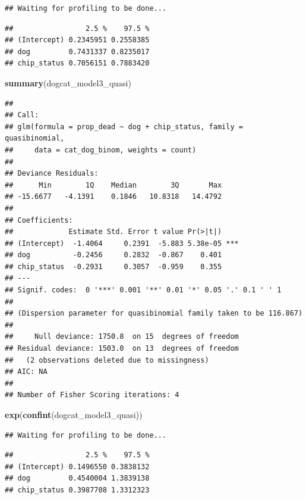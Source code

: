 \documentclass[]{article}
\newenvironment{Shaded}{\begin{snugshade}}{\end{snugshade}}
\newcommand{\KeywordTok}[1]{\textcolor[rgb]{0.13,0.29,0.53}{\textbf{#1}}}
\newcommand{\NormalTok}[1]{#1}
\begin{document}
\begin{verbatim}
## Waiting for profiling to be done...
\end{verbatim}

\begin{verbatim}
##                 2.5 %    97.5 %
## (Intercept) 0.2345951 0.2558385
## dog         0.7431337 0.8235017
## chip_status 0.7056151 0.7883420
\end{verbatim}

\begin{Shaded}
\begin{Highlighting}[]
\KeywordTok{summary}\NormalTok{(dogcat_model3_quasi)}
\end{Highlighting}
\end{Shaded}

\begin{verbatim}
## 
## Call:
## glm(formula = prop_dead ~ dog + chip_status, family = quasibinomial, 
##     data = cat_dog_binom, weights = count)
## 
## Deviance Residuals: 
##      Min        1Q    Median        3Q       Max  
## -15.6677   -4.1391    0.1846   10.8318   14.4792  
## 
## Coefficients:
##             Estimate Std. Error t value Pr(>|t|)    
## (Intercept)  -1.4064     0.2391  -5.883 5.38e-05 ***
## dog          -0.2456     0.2832  -0.867    0.401    
## chip_status  -0.2931     0.3057  -0.959    0.355    
## ---
## Signif. codes:  0 '***' 0.001 '**' 0.01 '*' 0.05 '.' 0.1 ' ' 1
## 
## (Dispersion parameter for quasibinomial family taken to be 116.867)
## 
##     Null deviance: 1750.8  on 15  degrees of freedom
## Residual deviance: 1503.0  on 13  degrees of freedom
##   (2 observations deleted due to missingness)
## AIC: NA
## 
## Number of Fisher Scoring iterations: 4
\end{verbatim}

\begin{Shaded}
\begin{Highlighting}[]
\KeywordTok{exp}\NormalTok{(}\KeywordTok{confint}\NormalTok{(dogcat_model3_quasi))}
\end{Highlighting}
\end{Shaded}

\begin{verbatim}
## Waiting for profiling to be done...
\end{verbatim}

\begin{verbatim}
##                 2.5 %    97.5 %
## (Intercept) 0.1496550 0.3838132
## dog         0.4540004 1.3839138
## chip_status 0.3987708 1.3312323
\end{verbatim}
\end{document}
